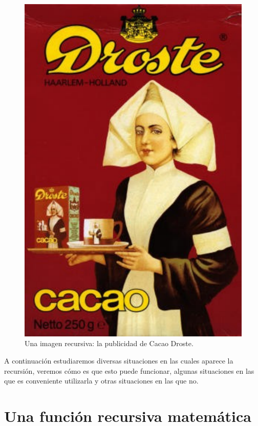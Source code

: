 \begin{figure}[h!]
  \centerline{\includegraphics[height=0.5\textheight]{graficos/droste}}
  \caption{\small Una imagen recursiva: la publicidad de Cacao Droste.}
\end{figure}

A continuación estudiaremos diversas situaciones en las cuales aparece la
recursión, veremos cómo es que esto puede funcionar, algunas situaciones en
las que es conveniente utilizarla y otras situaciones en las que no.

\vspace{2.5cm}

\section{Una función recursiva matemática}


